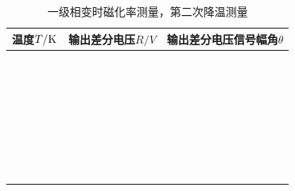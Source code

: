 \documentclass[11pt,a4paper]{ctexart}
\begin{document}
\begin{enumerate}
    \begin{table}[H]
\centering
\caption{一级相变时磁化率测量，第二次降温测量\label{tablez3}}
\begin{tabular}{|p{32mm}|p{32mm}|p{32mm}|}
\hline
温度$T/{\rm K}$ & 输出差分电压$R/{V}$ & 输出差分电压信号幅角$\theta$ \\ \hline
 & & \\ \hline
  & & \\ \hline
  & & \\ \hline
   & & \\ \hline
    & & \\ \hline
 & & \\ \hline
  &  &\\ \hline
  &  &\\ \hline
  &  &\\ \hline
  &  &\\ \hline
  &  &\\ \hline
  &  &\\ \hline
  &  &\\ \hline
  &  &\\ \hline
  &  &\\ \hline
  &  &\\ \hline
  &  &\\ \hline
  &  &\\ \hline
    & &\\ \hline
  & &\\ \hline
   & &\\ \hline
     &  &\\ \hline
  &  &\\ \hline
  &  &\\ \hline
  &  &\\ \hline
  &  &\\ \hline
  &  &\\ \hline
  &  &\\ \hline
  &  &\\ \hline
    & &\\ \hline
  & &\\ \hline
   & &\\ \hline
  \end{tabular}
  \end{table}
  

\end{enumerate}
\end{document}
